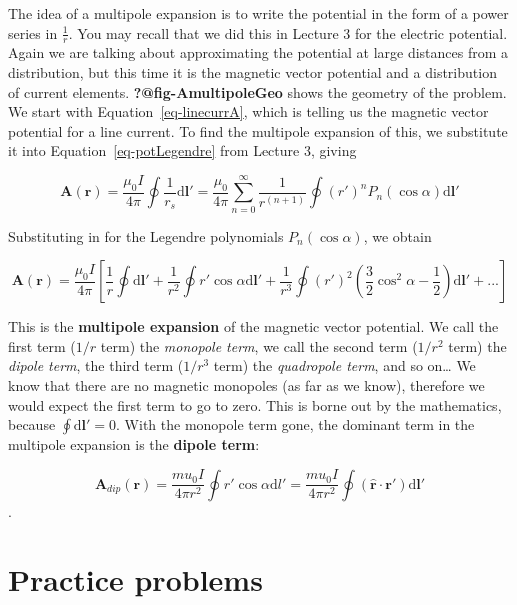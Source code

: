 \documentclass[
  letterpaper,
  DIV=11,
  numbers=noendperiod]{scrreprt}
\begin{document}
The idea of a multipole expansion is to write the potential in the form
of a power series in \(\frac{1}{r}\). You may recall that we did this in
Lecture 3 for the electric potential. Again we are talking about
approximating the potential at large distances from a distribution, but
this time it is the magnetic vector potential and a distribution of
current elements. \textbf{?@fig-AmultipoleGeo} shows the geometry of the
problem. We start with Equation~\ref{eq-linecurrA}, which is telling us
the magnetic vector potential for a line current. To find the multipole
expansion of this, we substitute it into Equation~\ref{eq-potLegendre}
from Lecture 3, giving

\[ \mathrm{\mathbf{A}}(\mathrm{\mathbf{r}}) = \frac{\mu_0 I}{4\pi} \oint \frac{1}{r_s} \mathrm{d}\mathrm{\mathbf{l}}' = \frac{\mu_0}{4\pi} \sum_{n=0}^{\infty} \frac{1}{r^{(n+1)}} \oint (r')^n P_n(\cos\alpha) \mathrm{d}\mathrm{\mathbf{l}}' \]

Substituting in for the Legendre polynomials \(P_n(\cos\alpha)\), we
obtain

\[ \mathrm{\mathbf{A}}(\mathrm{\mathbf{r}}) = \frac{\mu_0 I}{4\pi} \left[ \frac{1}{r} \oint \mathrm{d}\mathrm{\mathbf{l}}' + \frac{1}{r^2} \oint r' \cos\alpha \mathrm{d}\mathrm{\mathbf{l}}' + \frac{1}{r^3} \oint (r')^2 \left(  \frac{3}{2} \cos^2 \alpha - \frac{1}{2}  \right) \mathrm{d}\mathrm{\mathbf{l}}' + ... \right] \]

This is the \textbf{multipole expansion} of the magnetic vector
potential. We call the first term (\(1/r\) term) the \emph{monopole
term}, we call the second term (\(1/r^2\) term) the \emph{dipole term},
the third term (\(1/r^3\) term) the \emph{quadropole term}, and so
on\ldots{} We know that there are no magnetic monopoles (as far as we
know), therefore we would expect the first term to go to zero. This is
borne out by the mathematics, because
\(\oint \mathrm{d}\mathrm{\mathbf{l}}' = 0\). With the monopole term
gone, the dominant term in the multipole expansion is the \textbf{dipole
term}:

\[ \mathrm{\mathbf{A}}_{dip} (\mathrm{\mathbf{r}}) = \frac{mu_0 I}{4\pi r^2} \oint r' \cos\alpha \mathrm{d}l' = \frac{mu_0 I}{4\pi r^2} \oint (\hat{\mathrm{\mathbf{r}}} \cdot \mathrm{\mathbf{r}}') \mathrm{d}\mathrm{\mathbf{l}}'\].

\section{Practice problems}\label{practice-problems-5}
\end{document}
